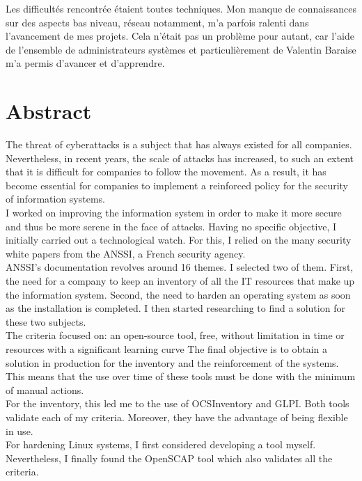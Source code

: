 \documentclass[12pt, a4paper, twoside]{article}
\begin{document}
Les difficultés rencontrée étaient toutes techniques.
Mon manque de connaissances sur des aspects bas niveau, réseau notamment, m'a parfois ralenti dans l'avancement de mes projets.
Cela n'était pas un problème pour autant, car l'aide de l'ensemble de administrateurs systèmes et particulièrement de Valentin Baraise m'a permis d'avancer et d'apprendre.

\newpage
\section*{Abstract}
The threat of cyberattacks is a subject that has always existed for all companies.
Nevertheless, in recent years, the scale of attacks has increased, to such an extent that it is difficult for companies to follow the movement.
As a result, it has become essential for companies to implement a reinforced policy for the security of information systems. \\

I worked on improving the information system in order to make it more secure and thus be more serene in the face of attacks.
Having no specific objective, I initially carried out a technological watch. 
For this, I relied on the many security white papers from the \gls{ANSSI}, a French security agency. \\

\gls{ANSSI}'s documentation revolves around 16 themes. 
I selected two of them.
First, the need for a company to keep an inventory of all the IT resources that make up the information system. 
Second, the need to harden an operating system as soon as the installation is completed.
I then started researching to find a solution for these two subjects. \\

The criteria focused on: an open-source tool, free, without limitation in time or resources with a significant learning curve
The final objective is to obtain a solution in production for the inventory and the reinforcement of the systems. 
This means that the use over time of these tools must be done with the minimum of manual actions. \\

For the inventory, this led me to the use of \gls{OCSInventory} and \gls{GLPI}. 
Both tools validate each of my criteria. 
Moreover, they have the advantage of being flexible in use. \\

For hardening Linux systems, I first considered developing a tool myself. 
Nevertheless, I finally found the OpenSCAP tool which also validates all the criteria. \\
\end{document}
